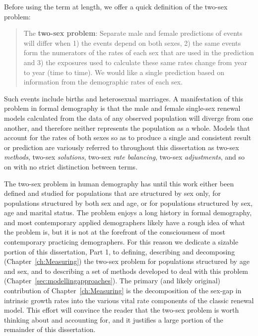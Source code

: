 
Before using the term at length, we offer a quick definition of the two-sex
problem:

\begin{singlespace}
\begin{quote}
The \textbf{two-sex problem}: Separate male and female predictions of events
will differ when 1) the events depend on both sexes, 2) the same events 
form the numerators of the rates of each sex that are used in the prediction and
3) the exposures used to calculate these same rates change from year to year
(time to time). We would like a single prediction based on information from the
demographic rates of each sex.
\end{quote}
\end{singlespace}

 Such events include births and heterosexual marriages.
 A manifestation of this problem in formal demography is that the male
 and female single-sex renewal models calculated from the data of any observed 
 population will diverge from one another, and therefore neither represents
 the population as a whole. Models that account for the rates of both sexes
 so as to produce a single and consistent result or prediction are
 variously referred to throughout this dissertation as two-sex \textit{methods},
 two-sex \textit{solutions}, two-sex \textit{rate balancing}, two-sex 
 \textit{adjustments}, and so on with no strict distinction between terms.
 
 The two-sex problem in human demography has until this work either been defined 
 and studied for populations that are structured by sex only, for populations
structured by both sex and age, or for populations structured by sex, age and
marital status. The problem enjoys a long history in formal demography, and most
contemporary applied demographers likely have a rough idea of what the problem
is, but it is not at the forefront of the consciousness of most contemporary
practicing demographers. For this reason we dedicate a sizable portion of 
this dissertation, Part 1, to defining, describing
and decomposing (Chapter~\ref{ch:Measuring}) the two-sex problem for populations
structured by age and sex, and to describing a set of methods developed to deal
with this problem (Chapter~\ref{sec:modellingapproaches}). The primary (and likely
original) contribution of Chapter~\ref{ch:Measuring} is the decomposition of the 
sex-gap in intrinsic growth rates into the various vital rate components of the 
classic renewal model. This effort will convince the reader that the two-sex
problem is worth thinking about and accounting for, and it justifies a large
portion of the remainder of this dissertation.

